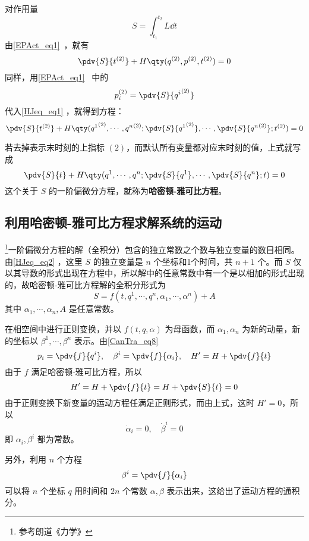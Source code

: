 
对作用量
\begin{equation}
S=\int_{t_1}^{t_2}L\dd t
\end{equation}
由\autoref{EPAct_eq1}~，就有
\begin{equation}\label{HJeq_eq1}
\pdv{S}{t^{(2)}}+H\qty(q^{(2)},p^{(2)},t^{(2)})=0
\end{equation}
同样，用\autoref{EPAct_eq1}~ 中的
\begin{equation}
p_i^{(2)}=\pdv{S}{{q^i}^{(2)}}
\end{equation}
代入\autoref{HJeq_eq1} ，就得到方程：
\begin{equation}
\pdv{S}{t^{(2)}}+H\qty({q^1}^{(2)},\cdots,{q^n}^{(2)};\pdv{S}{{q^1}^{(2)}},\cdots,\pdv{S}{{q^n}^{(2)}};t^{(2)})=0
\end{equation}

若去掉表示末时刻的上指标 $(2)$，而默认所有变量都对应末时刻的值，上式就写成
\begin{equation}\label{HJeq_eq2}
\pdv{S}{t}+H\qty({q^1},\cdots,{q^n};\pdv{S}{{q^1}},\cdots,\pdv{S}{{q^n}};t)=0
\end{equation}
这个关于 $S$ 的一阶偏微分方程，就称为\textbf{哈密顿-雅可比方程}。
\subsection{利用哈密顿-雅可比方程求解系统的运动}
\footnote{参考朗道《力学》}一阶偏微分方程的解（全积分）包含的独立常数之个数与独立变量的数目相同。由\autoref{HJeq_eq2} ，这里 $S$ 的独立变量是 $n$ 个坐标和1个时间，共 $n+1$ 个。而 $S$ 仅以其导数的形式出现在方程中，所以解中的任意常数中有一个是以相加的形式出现的，故哈密顿-雅可比方程解的全积分形式为
\begin{equation}
S=f(t,q^1,\cdots,q^n,\alpha_1,\cdots,\alpha^n)+A
\end{equation}
其中 $\alpha_1,\cdots,\alpha_n,A$ 是任意常数。

在相空间中进行正则变换，并以 $f(t,q,\alpha)$ 为母函数，而 $\alpha_1,\alpha_n$ 为新的动量，新的坐标以 $\beta^1,\cdots,\beta^n$ 表示。由\autoref{CanTra_eq8}~
\begin{equation}
p_i=\pdv{f}{q^i},\quad \beta^i=\pdv{f}{\alpha_i},\quad H'=H+\pdv{f}{t}
\end{equation}
由于 $f$ 满足哈密顿-雅可比方程，所以
\begin{equation}
H'=H+\pdv{f}{t}=H+\pdv{S}{t}=0
\end{equation}
由于正则变换下新变量的运动方程任满足正则形式，而由上式，这时 $H'=0$，所以
\begin{equation}
\dot\alpha_i=0,\quad\dot\beta^i=0
\end{equation}
即 $\alpha_i,\beta^i$ 都为常数。

另外，利用 $n$ 个方程
\begin{equation}
\beta^i=\pdv{f}{\alpha_i}
\end{equation}
可以将 $n$ 个坐标 $q$ 用时间和 $2n$ 个常数 $\alpha,\beta$ 表示出来，这给出了运动方程的通积分。